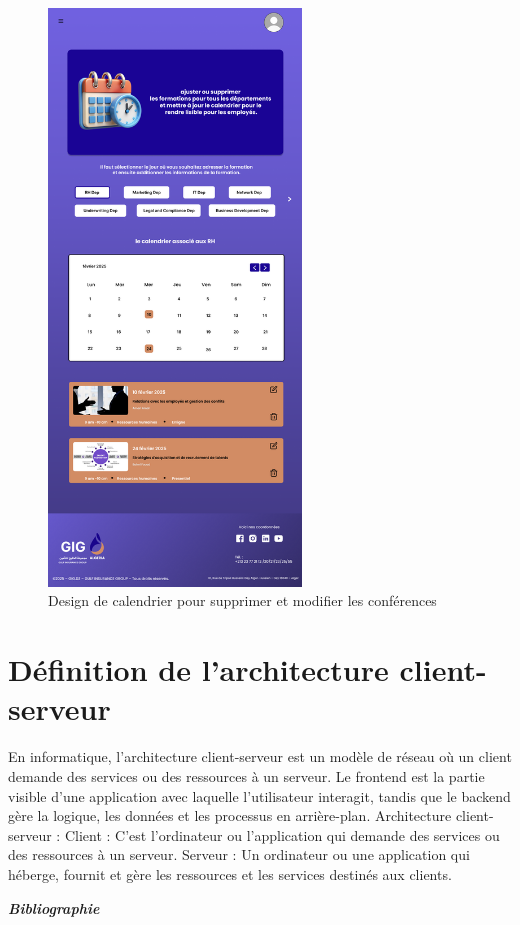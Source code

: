 \documentclass{article}
\begin{document}
  
\begin{figure}[H]
  \centering
  \includegraphics[width=0.6\textwidth]{Ajoute-formation.png}
  \caption{Design de calendrier pour supprimer et modifier les conférences}
  \end{figure}










\section{Définition de l'architecture client-serveur }
En informatique, l'architecture client-serveur est un modèle de réseau où un client demande des services ou des ressources à un serveur. Le frontend est la partie visible d'une application avec laquelle l'utilisateur interagit, tandis que le backend gère la logique, les données et les processus en arrière-plan. 
Architecture client-serveur :
Client :
C'est l'ordinateur ou l'application qui demande des services ou des ressources à un serveur. 
Serveur :
Un ordinateur ou une application qui héberge, fournit et gère les ressources et les services destinés aux clients. 
\label{annexe-client-ser}


\newpage
\begin{center}
{\Huge \textbf{\textit{Bibliographie}}}
\vspace{1cm}
\printbibliography[heading=none]





\end{center}
\end{document}

